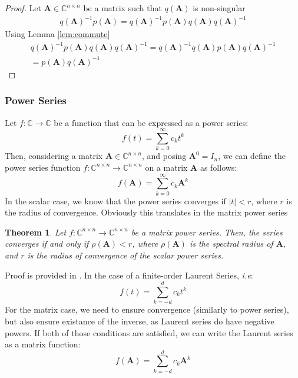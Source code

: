 \documentclass[11pt]{article}
\newtheorem{theorem}{Theorem}
\numberwithin{equation}{section}
\begin{document}
\begin{proof}
    Let $\mathbf{A}\in\mathbb{C}^{n\times n}$ be a matrix such that $q(\mathbf{A})$ is non-singular
    \begin{align*}
        q(\mathbf{A})^{-1}p(\mathbf{A}) = q(\mathbf{A})^{-1}p(\mathbf{A})q(\mathbf{A})q(\mathbf{A})^{-1} 
    \end{align*}
    Using Lemma \ref{lem:commute}
    \begin{align*}        
    q(\mathbf{A})^{-1}p(\mathbf{A})q(\mathbf{A})q(\mathbf{A})^{-1} = q(\mathbf{A})^{-1}q(\mathbf{A})p(\mathbf{A})q(\mathbf{A})^{-1} \\
        = p(\mathbf{A})q(\mathbf{A})^{-1}
    \end{align*}
\end{proof}

\subsubsection*{Power Series}
Let $f:\mathbb{C}\rightarrow\mathbb{C}$ be a function that can be expressed as a power series:
\begin{equation}
    f(t) = \sum_{k=0}^\infty c_k t^k
\end{equation}
Then, considering a matrix $\mathbf{A}\in\mathbb{C}^{n\times n}$, and posing $\mathbf{A}^0 = I_n$, we can define the power series function $f:\mathbb{C}^{n\times n}\rightarrow\mathbb{C}^{n\times n}$ on a matrix $\mathbf{A}$ as follows:
\begin{equation}
    f(\mathbf{A}) = \sum_{k=0}^\infty c_k \mathbf{A}^k
\end{equation}
In the scalar case, we know that the power series converges if $|t| < r$, where $r$ is the radius of convergence. Obviously this translates in the matrix power series
\begin{theorem}\label{th:power_convergence}
    Let $f:\mathbb{C}^{n\times n}\rightarrow\mathbb{C}^{n\times n}$ be a matrix power series. Then, the series converges if and only if $\rho(\mathbf{A}) < r$, where $\rho(\mathbf{A})$ is the spectral radius of $\mathbf{A}$, and $r$ is the radius of convergence of the scalar power series.
\end{theorem}
Proof is provided in \cite{frommer2008matrix}. In the case of a finite-order Laurent Series, \textit{i.e}:
\begin{equation}
    f(t) = \sum_{k=-d}^d c_k t^k
\end{equation}
For the matrix case, we need to ensure convergence (similarly to power series), but also ensure existance of the inverse, as Laurent series do have negative powers. If both of those conditions are satisfied, we can write the Laurent series as a matrix function:
\begin{equation}
    f(\mathbf{A}) = \sum_{k=-d}^d c_k \mathbf{A}^k
\end{equation}
\end{document}
